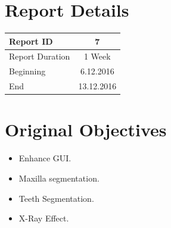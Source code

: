 \documentclass[11pt, b5paper]{article}
\begin{document}
\title{\rmfamily\normalfont{}}

\author{{\small Automatic Mandible Segmentation Using VTK}}

\date{\footnotesize{\today}}

\maketitle

% 
 


\section{Report Details}
\begin{center}
\begin{tabular}{ l | c }
\hline 
Report ID & 7  \\ %
\hline 
Report Duration & 1 Week \\ %
\hline 
Beginning & 6.12.2016 \\ %
\hline 
End & 13.12.2016 \\ %
\hline 
\end{tabular}
\end{center}

\section{Original Objectives}
\begin{itemize}
\item Enhance GUI.
\item Maxilla segmentation.
\item Teeth Segmentation.
\item X-Ray Effect.
\end{itemize}
\end{document}
